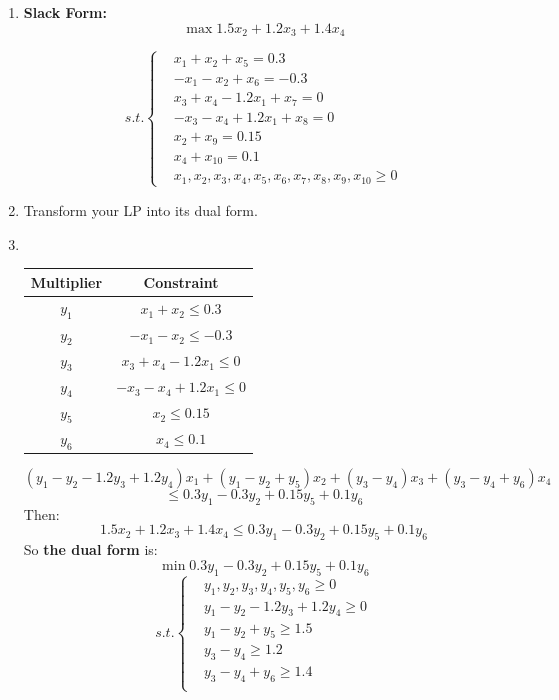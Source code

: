 \documentclass[12pt,a4paper]{article}
\makeatletter
\newtheorem*{solution}{Solution}
\theoremstyle{definition}
\renewenvironment{solution}[1][Solution] {\par\pushQED{\qed}\normalfont\topsep6\p@\@plus6\p@\relax\trivlist\item[\hskip\labelsep\bfseries#1\@addpunct{.}]\ignorespaces}{\popQED\endtrivlist\@endpefalse} \makeatother
\makeatother
\begin{document}
\begin{enumerate}
\begin{enumerate}
\begin{solution}
    \textbf{Slack Form: }
    $$
    \max 1.5x_2 + 1.2x_3 + 1.4x_4
    $$
    
    $$
    s.t.\left\{
    \begin{aligned}
    &x_1 + x_2+x_5 = 0.3\\
    &-x_1 - x_2 + x_6 = -0.3\\
    &x_3 + x_4 - 1.2x_1 + x_7 =  0\\
    &-x_3 - x_4 + 1.2x_1+x_8= 0\\
    &x_2 +x_9 =  0.15\\
    &x_4 +x_{10}=  0.1\\
    &x_1,x_2,x_3,x_4,x_5,x_6,x_7,x_8,x_9,x_{10}\geq 0
    \end{aligned}
    \right.
    $$
    
    \end{solution}
    \item
    Transform your LP into its dual form.
    \begin{solution}
    ~\\
    \begin{center}
        \begin{tabular}{c c}
        \hline
           Multiplier & Constraint \\
           \hline
            $y_1$  &$x_1 + x_2 \leq 0.3$\\
           $y_2$ &$-x_1 - x_2 \leq -0.3$\\
          $y_3$  &$x_3 + x_4 - 1.2x_1\leq 0$\\
            $y_4$ &$-x_3 - x_4 + 1.2x_1\leq 0$\\
           $y_5$ &$x_2 \leq 0.15$\\
           $y_6$ &$x_4 \leq 0.1$\\
           \hline
        \end{tabular}
    \end{center}
    $$
    (y_1-y_2-1.2y_3+1.2y_4)x_1 + (y_1-y_2+y_5)x_2 + (y_3-y_4)x_3 + (y_3-y_4+y_6)x_4 
    $$
    $$
    \leq 0.3y_1 -0.3y_2 + 0.15y_5 + 0.1y_6
    $$
    Then:
    $$
    1.5x_2 + 1.2x_3 + 1.4x_4 \leq 0.3y_1 -0.3y_2 + 0.15y_5 + 0.1y_6
    $$
    So \textbf{the dual form} is:
    $$
    \min 0.3y_1 -0.3y_2 + 0.15y_5 + 0.1y_6
    $$
    $$
    s.t.\left\{
    \begin{aligned}
    &y_1,y_2,y_3,y_4,y_5,y_6 \geq 0 \\
    &y_1-y_2-1.2y_3+1.2y_4 \geq 0 \\
    &y_1-y_2+y_5 \geq 1.5\\
    &y_3-y_4 \geq 1.2\\
    &y_3-y_4+y_6 \geq 1.4\\
    \end{aligned}
    \right.
    $$
    \end{solution}
    

\end{enumerate}
\end{enumerate}
\end{document}
